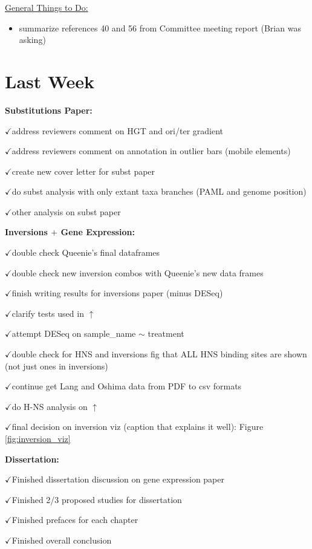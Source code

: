 \documentclass[12pt]{article}
\newcommand{\ch}{$\checkmark$}
\begin{document}
\underline{General Things to Do:}
\begin{itemize}
	\item summarize references 40 and 56 from Committee meeting report (Brian was asking)
	
	
\end{itemize}

\section*{Last Week}



\textbf{Substitutions Paper:}

\ch address reviewers comment on HGT and ori/ter gradient

\ch address reviewers comment on annotation in outlier bars (mobile elements)

\ch create new cover letter for subst paper

\ch do subst analysis with only extant taxa branches (PAML and genome position)

\ch other analysis on subst paper

\textbf{Inversions $+$ Gene Expression:}

\ch double check Queenie's final dataframes 

\ch double check new inversion combos with Queenie's new data frames

\ch finish writing results for inversions paper (minus DESeq)

\ch clarify tests used in $\uparrow$

\ch attempt DESeq on sample\_name $\sim$ treatment

\ch double check for HNS and inversions fig that ALL HNS binding sites are shown (not just ones in inversions)

\ch continue get Lang and Oshima data from PDF to csv formats

\ch do H-NS analysis on $\uparrow$

\ch final decision on inversion viz (caption that explains it well): Figure \ref{fig:inversion_viz}


\textbf{Dissertation:}

\ch Finished dissertation discussion on gene expression paper

\ch Finished 2/3 proposed studies for dissertation

\ch Finished prefaces for each chapter

\ch Finished overall conclusion
\end{document}
